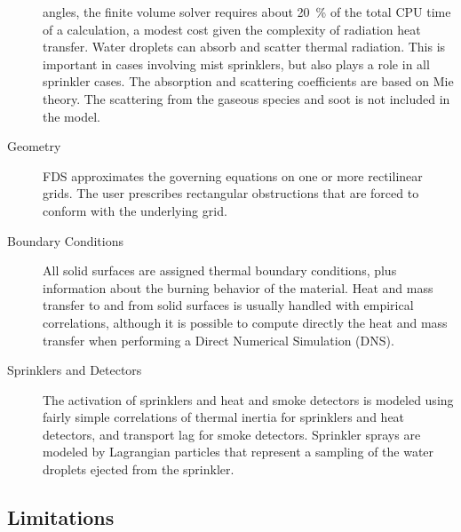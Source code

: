 \documentclass[11pt]{book}
\begin{document}
\begin{description}
angles, the finite volume solver requires about 20~\% of the total CPU
time of a calculation, a modest cost given the complexity of radiation
heat transfer.  Water droplets can absorb and scatter thermal
radiation. This is important in cases involving mist sprinklers, but
also plays a role in all sprinkler cases. The absorption and
scattering coefficients are based on Mie theory. The scattering from
the gaseous species and soot is not included in the model.
\item[Geometry]
FDS approximates the governing equations on one or more rectilinear grids. The
user prescribes rectangular obstructions that are forced to conform
with the underlying grid.
\item[Boundary Conditions]
All solid surfaces are assigned thermal boundary conditions, plus
information about the burning behavior of the material.
Heat and mass transfer to and from solid surfaces is
usually handled with empirical correlations, although it is possible
to compute directly the heat and mass transfer when performing a
Direct Numerical Simulation (DNS).
\item[Sprinklers and Detectors] The activation of sprinklers and heat and smoke detectors
is modeled using fairly simple correlations of thermal inertia for
sprinklers and heat detectors, and transport lag for smoke detectors.
Sprinkler sprays are modeled by Lagrangian particles that represent a sampling of the
water droplets ejected from the sprinkler.
\end{description}


\subsection{Limitations}
\end{document}
